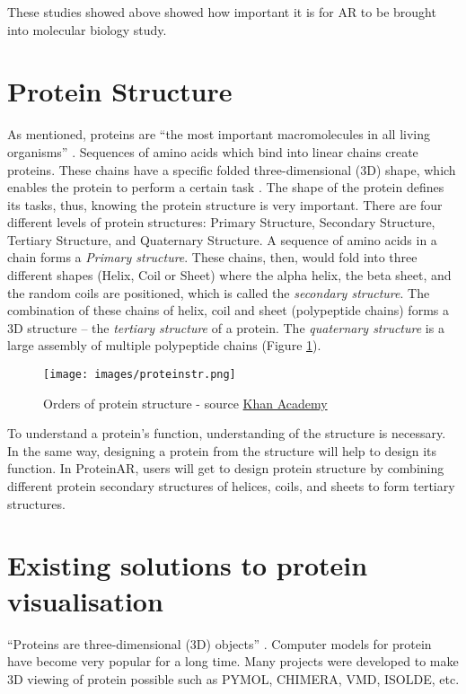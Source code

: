 These studies showed above showed how important it is for AR to be brought into molecular biology study.

\section{Protein Structure}

As mentioned, proteins are “the most important macromolecules in all living organisms” \parencite{rashid_protein_nodate}. Sequences of amino acids which bind into linear chains create proteins. These chains have a specific folded three-dimensional (3D) shape, which enables the protein to perform a certain task \parencite{rashid_protein_nodate}. The shape of the protein defines its tasks, thus, knowing the protein structure is very important. There are four different levels of protein structures: Primary Structure, Secondary Structure, Tertiary Structure, and Quaternary Structure. A sequence of amino acids in a chain forms a \emph{Primary structure}. These chains, then, would fold into three different shapes (Helix, Coil or Sheet) where the alpha helix, the beta sheet, and the random coils are positioned, which is called the \emph{secondary structure}. The combination of these chains of helix, coil and sheet (polypeptide chains) forms a 3D structure – the \emph{tertiary structure} of a protein. The \emph{quaternary structure} is a large assembly of multiple polypeptide chains (Figure \ref{fig:proteinstr}).
 \begin{figure}[!htp]
	\centering
	\texttt{[image: images/proteinstr.png]}
	\caption{Orders of protein structure - source \href{https://www.khanacademy.org/science/biology/macromolecules/proteins-and-amino-acids/a/orders-of-protein-structure}{Khan Academy}\parencite{noauthor_introduction_nodate}}
	\label{fig:proteinstr}
\end{figure}

To understand a protein’s function, understanding of the structure is necessary. In the same way, designing a protein from the structure will help to design its function. 
In ProteinAR, users will get to design protein structure by combining different protein secondary structures of helices, coils, and sheets to form tertiary structures. 

\section{Existing solutions to protein visualisation}
 “Proteins are three-dimensional (3D) objects” \parencite{ratamero_touching_2018}. Computer models for protein have become very popular for a long time. Many projects were developed to make 3D viewing of protein possible such as {\footnotesize PYMOL, CHIMERA, VMD, ISOLDE,} etc. 
 
